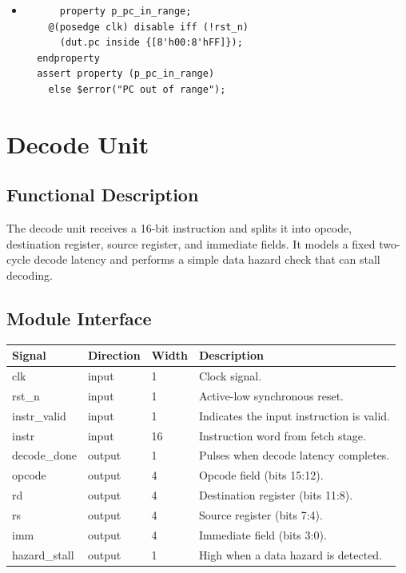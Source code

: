 \documentclass{article}
\begin{document}
\begin{itemize}
\begin{verbatim}
  assert property (p_instr_matches_mem)
    else $error("Instruction does not match memory at PC");
    \end{verbatim}
    \item \begin{verbatim}
      property p_pc_in_range;
    @(posedge clk) disable iff (!rst_n)
      (dut.pc inside {[8'h00:8'hFF]});
  endproperty
  assert property (p_pc_in_range)
    else $error("PC out of range");
    \end{verbatim}
\end{itemize}

\section{Decode Unit}

\subsection{Functional Description}
The decode unit receives a 16-bit instruction and splits it into opcode, destination register, source register, and immediate fields. It models a fixed two-cycle decode latency and performs a simple data hazard check that can stall decoding.

\subsection{Module Interface}
\begin{table}[H]
\centering
    \begin{tabular}{|l|l|l|p{8cm}|}
    \hline
    \textbf{Signal} & \textbf{Direction} & \textbf{Width} & \textbf{Description} \\
    \hline
    clk          & input  & 1   & Clock signal. \\
    rst\_n       & input  & 1   & Active-low synchronous reset. \\
    instr\_valid & input  & 1   & Indicates the input instruction is valid. \\
    instr        & input  & 16  & Instruction word from fetch stage. \\
    decode\_done & output & 1   & Pulses when decode latency completes. \\
    opcode       & output & 4   & Opcode field (bits 15:12). \\
    rd           & output & 4   & Destination register (bits 11:8). \\
    rs           & output & 4   & Source register (bits 7:4). \\
    imm          & output & 4   & Immediate field (bits 3:0). \\
    hazard\_stall& output & 1   & High when a data hazard is detected. \\
    \hline
    \end{tabular}
\end{table}
\end{document}
